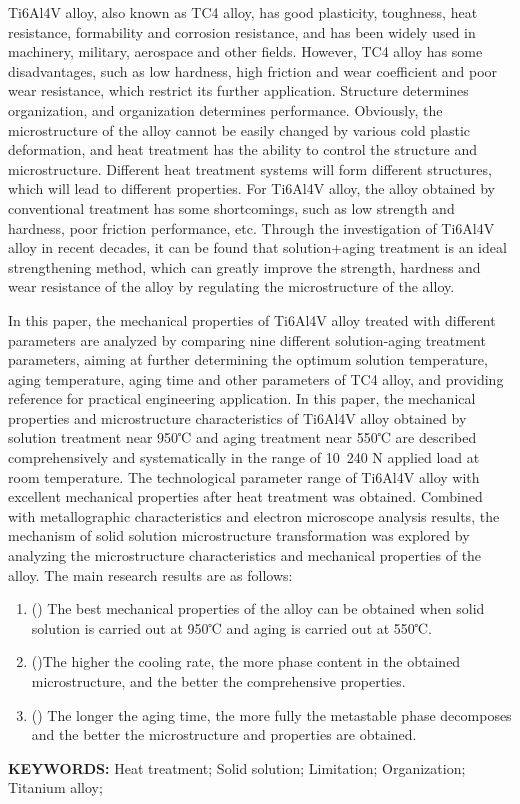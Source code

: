 \documentclass[
class = book,
zihao = -4,
font = noto,
paper = a4paper,
openany
]{easybook}
\begin{document}
\begin{enabstract}
	{\rmfamily
	Ti6Al4V alloy, also known as TC4 alloy, has good plasticity, toughness, heat resistance, formability and corrosion resistance, and has been widely used in machinery, military, aerospace and other fields. However, TC4 alloy has some disadvantages, such as low hardness, high friction and wear coefficient and poor wear resistance, which restrict its further application. Structure determines organization, and organization determines performance. Obviously, the microstructure of the alloy cannot be easily changed by various cold plastic deformation, and heat treatment has the ability to control the structure and microstructure. Different heat treatment systems will form different structures, which will lead to different properties. For Ti6Al4V alloy, the alloy obtained by conventional treatment has some shortcomings, such as low strength and hardness, poor friction performance, etc. Through the investigation of Ti6Al4V alloy in recent decades, it can be found that solution+aging treatment is an ideal strengthening method, which can greatly improve the strength, hardness and wear resistance of the alloy by regulating the microstructure of the alloy.

	In this paper, the mechanical properties of Ti6Al4V alloy treated with different parameters are analyzed by comparing nine different solution-aging treatment parameters, aiming at further determining the optimum solution temperature, aging temperature, aging time and other parameters of TC4 alloy, and providing reference for practical engineering application. In this paper, the mechanical properties and microstructure characteristics of Ti6Al4V alloy obtained by solution treatment near 950℃ and aging treatment near 550℃ are described comprehensively and systematically in the range of 10~240 N applied load at room temperature. The technological parameter range of Ti6Al4V alloy with excellent mechanical properties after heat treatment was obtained. Combined with metallographic characteristics and electron microscope analysis results, the mechanism of solid solution microstructure transformation was explored by analyzing the microstructure characteristics and mechanical properties of the alloy. The main research results are as follows:
	\begin{enumerate}
		\item () The best mechanical properties of the alloy can be obtained when solid solution is carried out at 950℃ and aging is carried out at 550℃.
		\item  ()The higher the cooling rate, the more phase content in the obtained microstructure, and the better the comprehensive properties.
		\item () The longer the aging time, the more fully the metastable phase decomposes and the better the microstructure and properties are obtained.
	\end{enumerate}
\textbf{KEYWORDS: } Heat treatment; Solid solution; Limitation; Organization; Titanium alloy; }
\end{enabstract}
\end{document}
